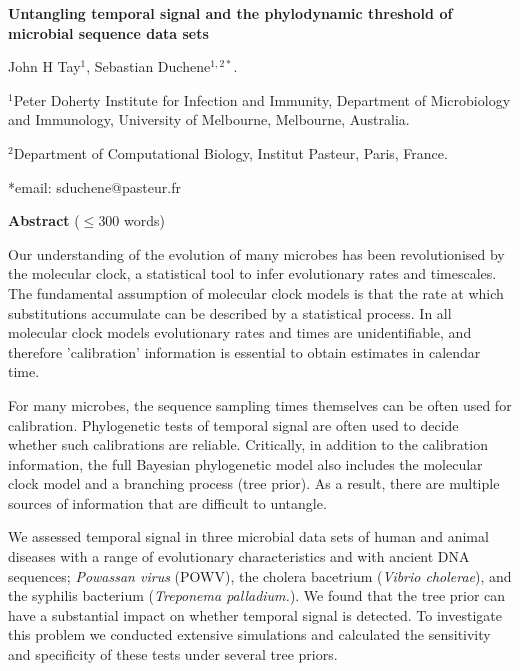 \documentclass[11pt]{article}
\begin{document}
\begin{flushright}
\end{flushright}
\begin{center}
	\begin{LARGE}
		\textbf{Untangling temporal signal and the phylodynamic threshold of microbial sequence data sets}
	\end{LARGE}
	
	John H Tay$^1$, Sebastian Duchene$^{1, 2*}$.

$^1$Peter Doherty Institute for Infection and Immunity, Department of Microbiology and Immunology, University of Melbourne, Melbourne, Australia.

$^2$Department of Computational Biology, Institut Pasteur, Paris, France.

\end{center}
*email: sduchene@pasteur.fr

\begin{Large}
	\textbf{Abstract} ($\le$300 words)
\end{Large}
Our understanding of the evolution of many microbes has been revolutionised by the molecular clock, a statistical tool to infer evolutionary rates and timescales. The fundamental assumption of molecular clock models is that the rate at which substitutions accumulate can be described by a statistical process. In all molecular clock models evolutionary rates and times are unidentifiable, and therefore 'calibration' information is essential to obtain estimates in calendar time.

For many microbes, the sequence sampling times themselves can be often used for calibration. Phylogenetic tests of temporal signal are often used to decide whether such calibrations are reliable. Critically, in addition to the calibration information, the full Bayesian phylogenetic model also includes the molecular clock model and a branching process (tree prior). As a result, there are multiple sources of information that are difficult to untangle.

We assessed temporal signal in three microbial data sets of human and animal diseases with a range of evolutionary characteristics and with ancient DNA sequences; \textit{Powassan virus} (POWV), the cholera bacetrium (\textit{Vibrio cholerae}), and the syphilis bacterium (\textit{Treponema palladium.}). We found that the tree prior can have a substantial impact on whether temporal signal is detected. To investigate this problem we conducted extensive simulations and calculated the sensitivity and specificity of these tests under several tree priors. 
\end{document}
